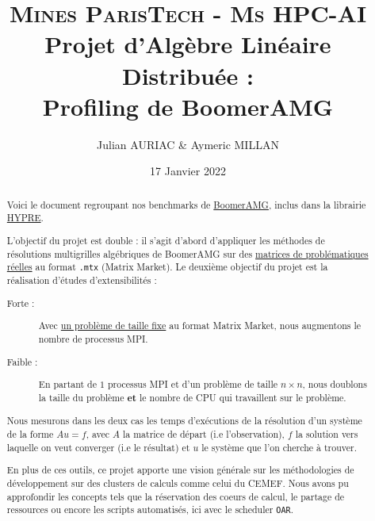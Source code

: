 \documentclass[10pt,twocolumn,letterpaper]{article}
\title{
		\usefont{OT1}{bch}{b}{n}
		\normalfont \normalsize \textsc{Mines ParisTech - Ms HPC-AI} \\ [10pt]
		\huge Projet d'Algèbre Linéaire Distribuée :\\ Profiling de BoomerAMG \\
}
\author{Julian AURIAC \& Aymeric MILLAN}
\affil{Cours de Christophe BOVET}
\date{17 Janvier 2022}
\def\code#1{\texttt{#1}}
\begin{document}
\setlength\headheight{26pt}


\maketitle

\thispagestyle{firstpage}
\begin{abstract}
Voici le document regroupant nos benchmarks de
\href{https://hypre.readthedocs.io/en/latest/solvers-boomeramg.html}{BoomerAMG},
inclus dans la librairie
\href{https://hypre.readthedocs.io/en/latest/index.html}{HYPRE}.

L'objectif du projet est double : il s'agit d'abord d'appliquer les méthodes de
résolutions multigrilles algébriques de BoomerAMG sur des
\href{https://sparse.tamu.edu/}{matrices de problématiques réelles} au format
\code{.mtx} (Matrix Market).
Le deuxième objectif du projet est la réalisation d'études
d'extensibilités :
\begin{description}
    \item [Forte :] Avec
\href{https://sparse.tamu.edu/Janna/Emilia_923}{un problème de taille fixe}
au format Matrix Market, nous augmentons le nombre de processus MPI.
    \item [Faible :] En partant de $1$ processus MPI et
d'un problème de taille $n \times n$, nous doublons la taille du problème
\textbf{et} le nombre de CPU qui travaillent sur le problème.
\end{description}

Nous mesurons dans les deux cas les temps d'exécutions de la résolution d'un
système de la forme $Au = f$, avec $A$ la matrice de départ (i.e l'observation),
$f$ la solution vers laquelle on veut converger (i.e le résultat) et $u$
le système que l'on cherche à trouver.

En plus de ces outils, ce projet apporte une vision générale sur les
méthodologies de développement sur des clusters de calculs comme celui du CEMEF.
Nous avons pu approfondir les concepts tels que la réservation des coeurs de
calcul, le partage de ressources ou encore les scripts automatisés,
ici avec le scheduler \code{OAR}.
\end{abstract}
\end{document}
